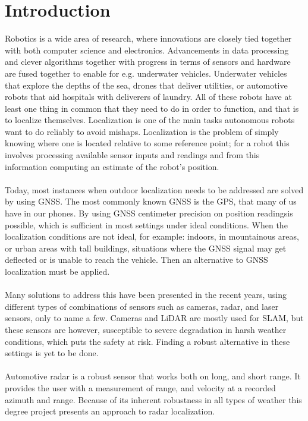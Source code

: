 \chapter{Introduction}
Robotics is a wide area of research, where innovations are closely tied together with both computer science and electronics. Advancements in data processing and clever algorithms together with progress in terms of sensors and hardware are fused together to enable for e.g. underwater vehicles. Underwater vehicles that explore the depths of the sea, drones that deliver utilities, or automotive robots that aid hospitals with deliverers of laundry. All of these robots have at least one thing in common that they need to do in order to function, and that is to localize themselves. Localization is one of the main tasks autonomous robots want to do reliably to avoid mishaps. Localization is the problem of simply knowing where one is located relative to some reference point; for a robot this involves processing available sensor inputs and readings and from this information computing an estimate of the robot’s position. 
\\\\
Today, most instances when outdoor localization needs to be addressed are solved by using \ac{GNSS}. The most commonly known GNSS is the \ac{GPS}, that many of us have in our phones. By using GNSS centimeter precision on position readingsis possible, which is sufficient in most settings under ideal conditions. When the localization conditions are not ideal, for example: indoors, in mountainous areas, or urban areas with tall buildings, situations where the GNSS signal may get deflected or is unable to reach the vehicle. Then an alternative to GNSS localization must be applied.
\\\\
Many solutions to address this have been presented in the recent years, using different types of combinations of sensors such as cameras, radar, and laser sensors, only to name a few. Cameras and \ac{LiDAR} are mostly used for \ac{SLAM}, but these sensors are however, susceptible to severe degradation in harsh weather conditions, which puts the safety at risk. Finding a robust alternative in these settings is yet to be done. 
\\\\
Automotive radar is a robust sensor that works both on long, and short range. It provides the user with a measurement of range, and velocity at a recorded azimuth and range. Because of its inherent robustness in all types of weather this degree project presents an approach to radar localization.
